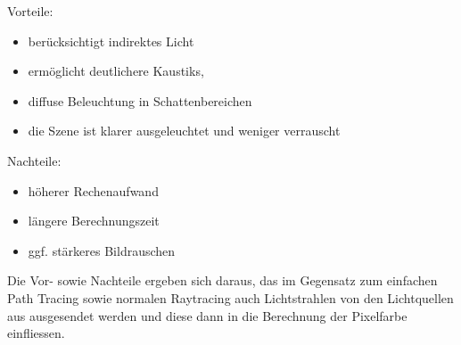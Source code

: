 \documentclass[12pt]{scrreprt}
\begin{document}
Vorteile:

\begin{itemize}
  \item berücksichtigt indirektes Licht
  \item ermöglicht deutlichere Kaustiks,
  \item diffuse Beleuchtung in Schattenbereichen
  \item die Szene ist klarer ausgeleuchtet und weniger verrauscht
\end{itemize}

Nachteile:

\begin{itemize}
  \item höherer Rechenaufwand
  \item längere Berechnungszeit
  \item ggf. stärkeres Bildrauschen
\end{itemize}

Die Vor- sowie Nachteile ergeben sich daraus, das im Gegensatz zum einfachen Path Tracing sowie normalen Raytracing auch Lichtstrahlen von den Lichtquellen aus ausgesendet werden und diese dann in die Berechnung der Pixelfarbe einfliessen.
\end{document}
